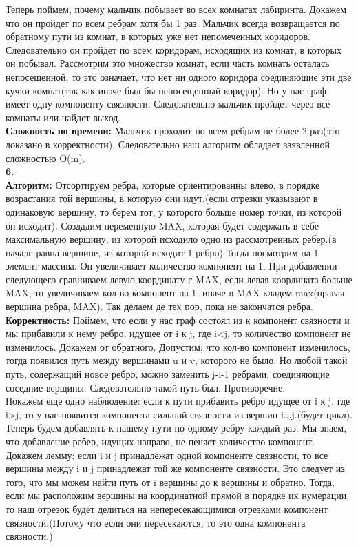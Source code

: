 \documentclass[a4paper,12pt]{article}
\begin{document}
Теперь поймем, почему мальчик побывает во всех комнатах лабиринта. Докажем что он пройдет по всем ребрам хотя бы 1 раз. Мальчик всегда возвращается по обратному пути из комнат, в которых уже нет непомеченных коридоров. Следовательно он пройдет по всем коридорам, исходящих из комнат, в которых он побывал. Рассмотрим это множество комнат, если часть комнать осталась непосещенной, то это означает, что нет ни одного коридора соединяющие эти две кучки комнат(так как иначе был бы непосещенный коридор). Но у нас граф имеет одну компоненту связности. Следовательно мальчик пройдет через все комнаты или найдет выход.\\
\textbf{Сложность по времени:} Мальчик проходит по всем ребрам не более 2 раз(это доказано в корректности). Следовательно наш алгоритм обладает заявленной сложностью O(m).\\
\textbf{6.}\\
\textbf{Алгоритм:} Отсортируем ребра, которые ориентированны влево, в порядке возрастания той вершины, в которую они идут.(если отрезки указывают в одинаковую вершину, то берем тот, у которого больше номер точки, из которой он исходит). Создадим переменную MAX, которая будет содержать в себе максимальную вершину, из которой исходило одно из рассмотренных ребер.(в начале равна вершине, из которой исходит 1 ребро) Тогда  посмотрим на 1 элемент массива.  Он увеличивает количество компонент на 1. При добавлении следующего сравниваем левую координату с MAX, если левая координата больше MAX, то увеличиваем кол-во компонент на 1, иначе в MAX кладем max(правая вершина ребра, MAX). Так делаем де тех пор, пока не закончатся ребра.\\
\textbf{Корректность:} Поймем, что если у нас граф состоял из к компонент связности и мы прибавили к нему ребро, идущее от i к j, где i<j, то количество компонент не изменилось. Докажем от обратного. Допустим, что кол-во компонент изменилось, тогда появился путь между вершинами u и  v, которого не было. Но любой такой путь, содержащий новое ребро, можно заменить j-i-1 ребрами, соединяющие соседние верщины. Следовательно такой путь был. Противоречие.\\
Покажем еще одно наблюдение: если к пути прибавить ребро идущее от i к j, где i>j, то у нас появится компонента сильной связности из вершин i...j.(будет цикл). \\
Теперь будем добавлять к нашему пути по одному ребру каждый раз. Мы знаем, что добавление ребер, идущих направо, не пеняет количество компонент.  \\
Докажем лемму: если i и  j принадлежат одной компоненте связности, то все вершины между i и  j принадлежат той же компоненте связности. Это следует из того, что мы можем найти путь от i  вершины до к вершины и обратно. Тогда, если мы расположим вершины на координатной прямой в порядке их нумерации, то наш отрезок будет делиться на непересекающимися отрезками компонент связности.(Потому что если они пересекаются, то это одна компонента связности.)\\
\end{document}
